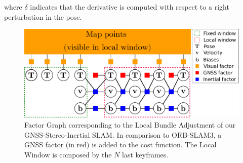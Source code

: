 where $\delta$ indicates that the derivative is computed with respect to a right perturbation in the pose.

%
\begin{figure}[!tb]
    \centering
    \includegraphics[width=\columnwidth]{images/graph.pdf}
    \caption{Factor Graph corresponding to the Local Bundle Adjustment of our GNSS-Stereo-Inertial SLAM. In comparison to ORB-SLAM3, a GNSS factor (in red) is added to the cost function. The Local Window is composed by the $N$ last keyframes.}
    \label{fig:graph}
\end{figure}
